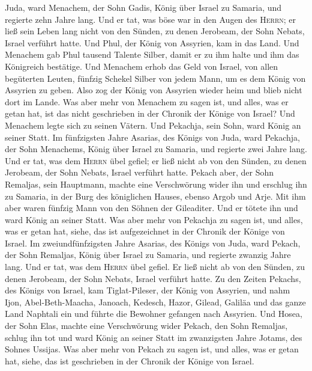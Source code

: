 Juda, ward Menachem, der Sohn Gadis, König über Israel zu Samaria, und
regierte zehn Jahre lang.  Und er tat, was böse war in
den Augen des \textsc{Herrn}; er ließ sein Leben lang nicht von den
Sünden, zu denen Jerobeam, der Sohn Nebats, Israel verführt hatte.
 Und Phul, der König von Assyrien, kam in das Land. Und
Menachem gab Phul tausend Talente Silber, damit er zu ihm halte und ihm
das Königreich bestätige.  Und Menachem erhob das Geld
von Israel, von allen begüterten Leuten, fünfzig Schekel Silber von
jedem Mann, um es dem König von Assyrien zu geben. Also zog der König
von Assyrien wieder heim und blieb nicht dort im Lande. 
Was aber mehr von Menachem zu sagen ist, und alles, was er getan hat,
ist das nicht geschrieben in der Chronik der Könige von Israel?
 Und Menachem legte sich zu seinen Vätern. Und Pekachja,
sein Sohn, ward König an seiner Statt.  Im fünfzigsten
Jahre Asarias, des Königs von Juda, ward Pekachja, der Sohn Menachems,
König über Israel zu Samaria, und regierte zwei Jahre lang.
 Und er tat, was dem \textsc{Herrn} übel gefiel; er ließ
nicht ab von den Sünden, zu denen Jerobeam, der Sohn Nebats, Israel
verführt hatte.  Pekach aber, der Sohn Remaljas, sein
Hauptmann, machte eine Verschwörung wider ihn und erschlug ihn zu
Samaria, in der Burg des königlichen Hauses, ebenso Argob und Arje. Mit
ihm aber waren fünfzig Mann von den Söhnen der Gileaditer. Und er tötete
ihn und ward König an seiner Statt.  Was aber mehr von
Pekachja zu sagen ist, und alles, was er getan hat, siehe, das ist
aufgezeichnet in der Chronik der Könige von Israel.  Im
zweiundfünfzigsten Jahre Asarias, des Königs von Juda, ward Pekach, der
Sohn Remaljas, König über Israel zu Samaria, und regierte zwanzig Jahre
lang.  Und er tat, was dem \textsc{Herrn} übel gefiel. Er
ließ nicht ab von den Sünden, zu denen Jerobeam, der Sohn Nebats, Israel
verführt hatte.  Zu den Zeiten Pekachs, des Königs von
Israel, kam Tiglat-Pileser, der König von Assyrien, und nahm Ijon,
Abel-Beth-Maacha, Janoach, Kedesch, Hazor, Gilead, Galiläa und das ganze
Land Naphtali ein und führte die Bewohner gefangen nach Assyrien.
 Und Hosea, der Sohn Elas, machte eine Verschwörung wider
Pekach, den Sohn Remaljas, schlug ihn tot und ward König an seiner Statt
im zwanzigsten Jahre Jotams, des Sohnes Ussijas.  Was
aber mehr von Pekach zu sagen ist, und alles, was er getan hat, siehe,
das ist geschrieben in der Chronik der Könige von Israel.
